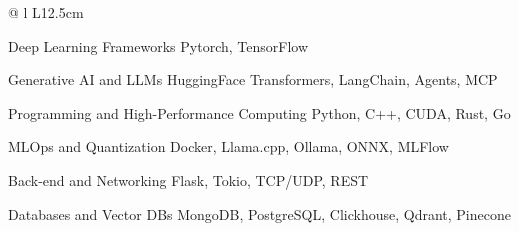 \renewenvironment{cvskills}{%
  \vspace{\acvSectionContentTopSkip}
  \vspace{-2.0mm}
  \begin{center}
    \begin{tabular*}{\textwidth}{@{\extracolsep{\fill}} l L{12.5cm}}
  }{%
    \end{tabular*}
  \end{center}
}

\begin{cvskills}

  \cvskill
    {Deep Learning Frameworks} %
    {Pytorch, TensorFlow}%

  \cvskill
    {Generative AI and LLMs} %
    {HuggingFace Transformers, LangChain, Agents, MCP} %

  \cvskill
    {Programming and High-Performance Computing} %
    {Python, C++, CUDA, Rust, Go} %

  \cvskill
    {MLOps and Quantization} %
    {Docker, Llama.cpp, Ollama, ONNX, MLFlow} %

  \cvskill
    {Back-end and Networking} %
    {Flask, Tokio, TCP/UDP, REST} %

  \cvskill
    {Databases and Vector DBs} %
    {MongoDB, PostgreSQL, Clickhouse, Qdrant, Pinecone} %

\end{cvskills}
